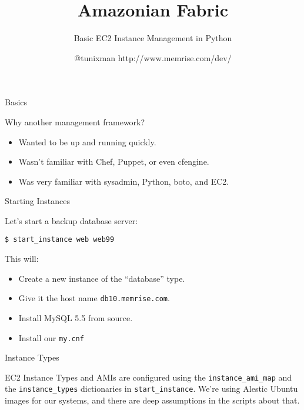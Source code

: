 \documentclass{beamer}
\title{Amazonian Fabric}
\subtitle{Basic EC2 Instance Management in Python}
\author{@tunixman
http://www.memrise.com/dev/}
\begin{document}
\begin{frame}{Basics}

Why another management framework?

\begin{itemize}

\item Wanted to be up and running quickly.
\item Wasn't familiar with Chef, Puppet, or even cfengine.
\item Was very familiar with sysadmin, Python, boto, and EC2.

\end{itemize}

\end{frame}

\begin{frame}{Starting Instances}

Let's start a backup database server:

\begin{example}
\texttt{\$ start\_instance web web99}
\end{example}

This will:

\begin{itemize}
\item Create a new instance of the ``database'' type.
\item Give it the host name \texttt{db10.memrise.com}.
\item Install MySQL 5.5 from source.
\item Install our \texttt{my.cnf}
\end{itemize}

\end{frame}

\begin{frame}{Instance Types}

  EC2 Instance Types and AMIs are configured using the
  \texttt{instance\_ami\_map} and the \texttt{instance\_types}
  dictionaries in \texttt{start\_instance}. We're using Alestic Ubuntu
  images for our systems, and there are deep assumptions in the
  scripts about that.

\end{frame}
\end{document}
